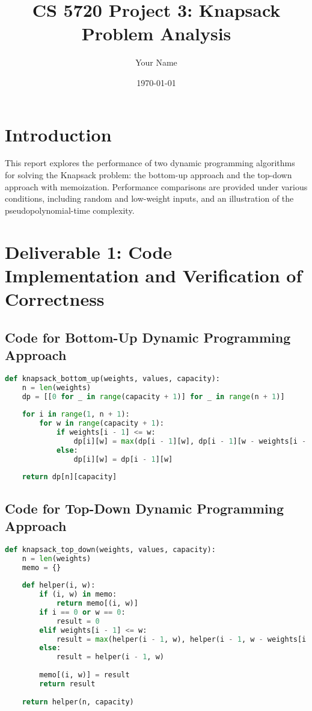 \documentclass{article}
\title{CS 5720 Project 3: Knapsack Problem Analysis}
\author{Your Name}
\date{\today}
\begin{document}
\maketitle

\section*{Introduction}
This report explores the performance of two dynamic programming algorithms for solving the Knapsack problem: the bottom-up approach and the top-down approach with memoization. Performance comparisons are provided under various conditions, including random and low-weight inputs, and an illustration of the pseudopolynomial-time complexity.

\section{Deliverable 1: Code Implementation and Verification of Correctness}
\subsection*{Code for Bottom-Up Dynamic Programming Approach}
\begin{lstlisting}[language=Python]
def knapsack_bottom_up(weights, values, capacity):
    n = len(weights)
    dp = [[0 for _ in range(capacity + 1)] for _ in range(n + 1)]
    
    for i in range(1, n + 1):
        for w in range(capacity + 1):
            if weights[i - 1] <= w:
                dp[i][w] = max(dp[i - 1][w], dp[i - 1][w - weights[i - 1]] + values[i - 1])
            else:
                dp[i][w] = dp[i - 1][w]
    
    return dp[n][capacity]
\end{lstlisting}

\subsection*{Code for Top-Down Dynamic Programming Approach}
\begin{lstlisting}[language=Python]
def knapsack_top_down(weights, values, capacity):
    n = len(weights)
    memo = {}
    
    def helper(i, w):
        if (i, w) in memo:
            return memo[(i, w)]
        if i == 0 or w == 0:
            result = 0
        elif weights[i - 1] <= w:
            result = max(helper(i - 1, w), helper(i - 1, w - weights[i - 1]) + values[i - 1])
        else:
            result = helper(i - 1, w)
        
        memo[(i, w)] = result
        return result
    
    return helper(n, capacity)
\end{lstlisting}
\end{document}
